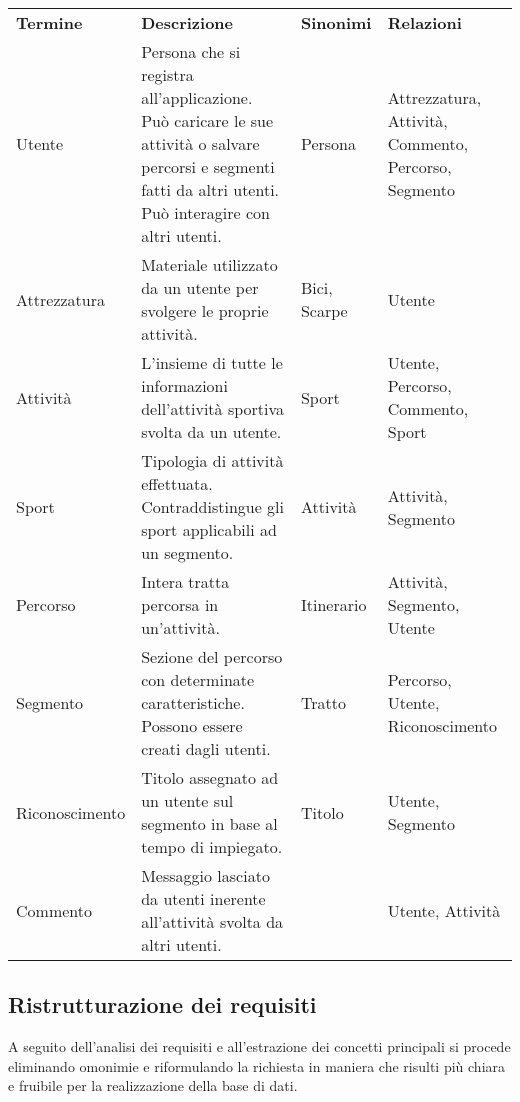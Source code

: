 \documentclass[12pt]{report}
\begin{document}
\begin{table}[h!]
    \centering
    \renewcommand{\arraystretch}{1.5} %
    \begin{tabularx}{\textwidth}{
        >{\raggedright\arraybackslash}p{}%
        >{\raggedright\arraybackslash}p{}%
        >{\raggedright\arraybackslash}p{}%
        >{\raggedright\arraybackslash}p{}%
        }
    \arrayrulecolor[HTML]{BDBFC3}
    \rowcolor[HTML]{cef3fe} 
    \textbf{Termine} & \textbf{Descrizione} & \textbf{Sinonimi} & \textbf{Relazioni} \\
    Utente & Persona che si registra all'applicazione. Può caricare le sue attività o salvare percorsi e segmenti fatti da altri utenti. Può interagire con altri utenti. & Persona & Attrezzatura, Attività, Commento, Percorso, Segmento\\ \hline
    Attrezzatura & Materiale utilizzato da un utente per svolgere le proprie attività. & Bici, Scarpe & Utente \\ \hline 
	Attività & L'insieme di tutte le informazioni dell'attività sportiva svolta da un utente. & Sport & Utente, Percorso, Commento, Sport\\ \hline
    Sport & Tipologia di attività effettuata. Contraddistingue gli sport applicabili ad un segmento. & Attività & Attività, Segmento\\ \hline
    Percorso & Intera tratta percorsa in un'attività. & Itinerario & Attività, Segmento, Utente\\ \hline
    Segmento & Sezione del percorso con determinate caratteristiche. Possono essere creati dagli utenti. & Tratto & Percorso, Utente, Riconoscimento \\ \hline
    Riconoscimento & Titolo assegnato ad un utente sul segmento in base al tempo di impiegato. & Titolo & Utente, Segmento\\ \hline
	Commento & Messaggio lasciato da utenti inerente all'attività svolta da altri utenti. & & Utente, Attività \\
    \end{tabularx}
\end{table}

\subsection*{Ristrutturazione dei requisiti}
A seguito dell'analisi dei requisiti e all'estrazione dei concetti principali si procede eliminando omonimie e
riformulando la richiesta in maniera che risulti più chiara e fruibile per la realizzazione della base di dati.
\end{document}
